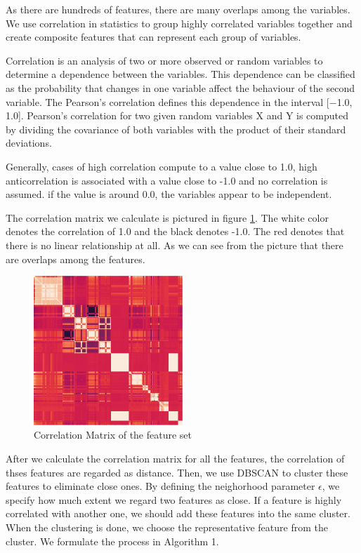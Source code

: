\documentclass[5p]{elsarticle}
\begin{document}
As there are hundreds of features, there are many overlaps among the variables. We use correlation in statistics to group highly correlated variables together and create composite features that can represent each group of variables.

Correlation is an analysis of two or more observed or random variables to determine a dependence between the variables. This dependence can be classified as the probability that changes in one variable affect the behaviour of the second variable. The Pearson’s correlation defines this dependence in the interval [−1.0, 1.0]. Pearson’s correlation for two given random variables X and Y is computed by dividing the covariance of both variables with the product of their standard deviations.

Generally, cases of high correlation compute to a value close to 1.0, high anticorrelation is associated with a value close to -1.0 and no correlation is assumed. if the value is around 0.0, the variables appear to be independent. 

The correlation matrix we calculate is pictured in figure \ref{fig:Correlation_matrix}. The white color denotes the correlation of 1.0 and the black denotes -1.0. The red denotes that there is no linear relationship at all. As we can see from the picture that there are overlaps among the features.

\begin{figure}[h]
    \centering
    \includegraphics[width=0.5\textwidth]{Correlation_Matrix.png}
    \caption{Correlation Matrix of the feature set}
    \label{fig:Correlation_matrix}
\end{figure}

After we calculate the correlation matrix for all the features, the correlation of thses features are regarded as distance. Then, we use DBSCAN to cluster these features to eliminate close ones. By defining the neighorhood parameter $\epsilon$, we specify how much extent we regard two features as close. If a feature is highly correlated with another one, we should add these features into the same cluster. When the clustering is done, we choose the representative feature from the cluster. We formulate the process in Algorithm 1.
\end{document}

